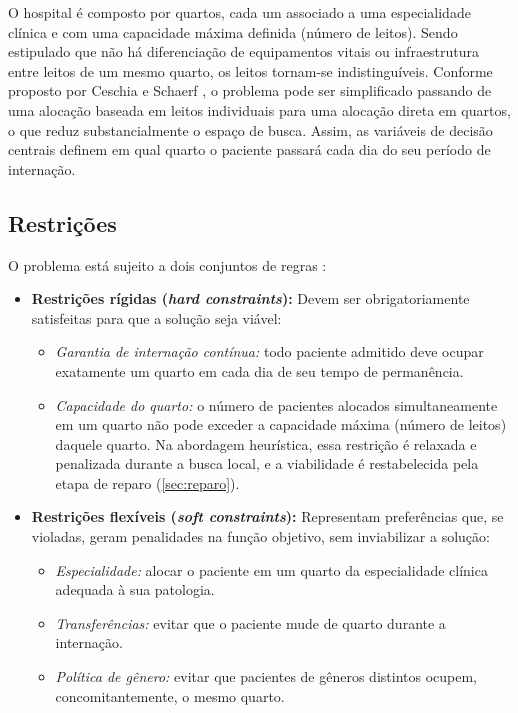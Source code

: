 O hospital é composto por quartos, cada um associado a uma especialidade clínica e com uma capacidade máxima definida (número de leitos). Sendo estipulado que não há diferenciação de equipamentos vitais ou infraestrutura entre leitos de um mesmo quarto, os leitos tornam-se indistinguíveis. Conforme proposto por Ceschia e Schaerf \cite{ceschia2012modeling}, o problema pode ser simplificado passando de uma alocação baseada em leitos individuais para uma alocação direta em quartos, o que reduz substancialmente o espaço de busca. Assim, as variáveis de decisão centrais definem em qual quarto o paciente passará cada dia do seu período de internação.

\subsection{Restrições}

O problema está sujeito a dois conjuntos de regras \cite{ceschia2012modeling, demeester2010hybrid}:
\begin{itemize}
    \item \textbf{Restrições rígidas (\textit{hard constraints}):} Devem ser obrigatoriamente satisfeitas para que a solução seja viável:
    \begin{itemize}
        \item \textit{Garantia de internação contínua:} todo paciente admitido deve ocupar exatamente um quarto em cada dia de seu tempo de permanência.
        \item \textit{Capacidade do quarto:} o número de pacientes alocados simultaneamente em um quarto não pode exceder a capacidade máxima (número de leitos) daquele quarto. Na abordagem heurística, essa restrição é relaxada e penalizada durante a busca local, e a viabilidade é restabelecida pela etapa de reparo (\autoref{sec:reparo}).
        
    \end{itemize}
    \item \textbf{Restrições flexíveis (\textit{soft constraints}):} Representam preferências que, se violadas, geram penalidades na função objetivo, sem inviabilizar a solução:
    \begin{itemize}
        \item \textit{Especialidade:} alocar o paciente em um quarto da especialidade clínica adequada à sua patologia.
        \item \textit{Transferências:} evitar que o paciente mude de quarto durante a internação.
        \item \textit{Política de gênero:} evitar que pacientes de gêneros distintos ocupem, concomitantemente, o mesmo quarto.
    \end{itemize}
\end{itemize}

